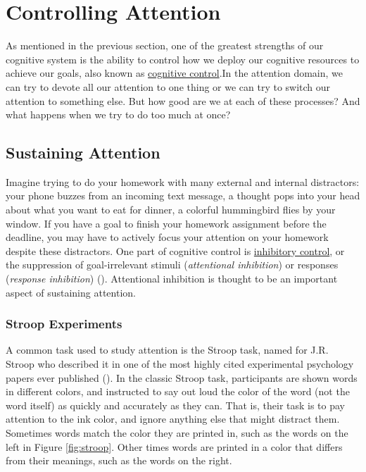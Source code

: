 \documentclass[
]{krantz}
\begin{document}
\section{Controlling Attention}\label{controlling-attention}

As mentioned in the previous section, one of the greatest strengths of our cognitive system is the ability to control how we deploy our cognitive resources to achieve our goals, also known as \hyperref[cognitive-control]{cognitive control}.In the attention domain, we can try to devote all our attention to one thing or we can try to switch our attention to something else. But how good are we at each of these processes? And what happens when we try to do too much at once?

\subsection*{Sustaining Attention}\label{sustaining-attention}


Imagine trying to do your homework with many external and internal distractors: your phone buzzes from an incoming text message, a thought pops into your head about what you want to eat for dinner, a colorful hummingbird flies by your window. If you have a goal to finish your homework assignment before the deadline, you may have to actively focus your attention on your homework despite these distractors. One part of cognitive control is \hyperref[inhibitory-control]{inhibitory control}, or the suppression of goal-irrelevant stimuli (\emph{attentional inhibition}) or responses (\emph{response inhibition}) (). Attentional inhibition is thought to be an important aspect of sustaining attention.

\subsubsection*{Stroop Experiments}\label{stroop-experiments}


A common task used to study attention is the Stroop task, named for J.R. Stroop who described it in one of the most highly cited experimental psychology papers ever published (). In the classic Stroop task, participants are shown words in different colors, and instructed to say out loud the color of the word (not the word itself) as quickly and accurately as they can. That is, their task is to pay attention to the ink color, and ignore anything else that might distract them. Sometimes words match the color they are printed in, such as the words on the left in Figure \ref{fig:stroop}. Other times words are printed in a color that differs from their meanings, such as the words on the right.
\end{document}
